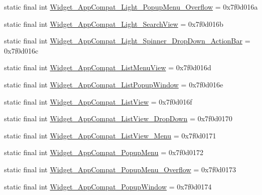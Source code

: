 \begin{DoxyCompactItemize}
static final int \mbox{\hyperlink{classandroid_1_1support_1_1v7_1_1appcompat_1_1R_1_1style_a8fd24e81a530ef4c300f29f6c046d707}{Widget\+\_\+\+App\+Compat\+\_\+\+Light\+\_\+\+Popup\+Menu\+\_\+\+Overflow}} = 0x7f0d016a
\item 
static final int \mbox{\hyperlink{classandroid_1_1support_1_1v7_1_1appcompat_1_1R_1_1style_a9f6f0009b817cabb1dafecf4b0c724c3}{Widget\+\_\+\+App\+Compat\+\_\+\+Light\+\_\+\+Search\+View}} = 0x7f0d016b
\item 
static final int \mbox{\hyperlink{classandroid_1_1support_1_1v7_1_1appcompat_1_1R_1_1style_a98acdcba1fa055bc28faa0fc74c7076a}{Widget\+\_\+\+App\+Compat\+\_\+\+Light\+\_\+\+Spinner\+\_\+\+Drop\+Down\+\_\+\+Action\+Bar}} = 0x7f0d016c
\item 
static final int \mbox{\hyperlink{classandroid_1_1support_1_1v7_1_1appcompat_1_1R_1_1style_a5d112506c796702ee241f523e76af8ce}{Widget\+\_\+\+App\+Compat\+\_\+\+List\+Menu\+View}} = 0x7f0d016d
\item 
static final int \mbox{\hyperlink{classandroid_1_1support_1_1v7_1_1appcompat_1_1R_1_1style_ad2af4cc0425e1ade5f5e5468ea0f6097}{Widget\+\_\+\+App\+Compat\+\_\+\+List\+Popup\+Window}} = 0x7f0d016e
\item 
static final int \mbox{\hyperlink{classandroid_1_1support_1_1v7_1_1appcompat_1_1R_1_1style_a1ceeced9a6c41e73bebf6d3531b7f05a}{Widget\+\_\+\+App\+Compat\+\_\+\+List\+View}} = 0x7f0d016f
\item 
static final int \mbox{\hyperlink{classandroid_1_1support_1_1v7_1_1appcompat_1_1R_1_1style_afae0a0c13593ec0b5f020075de5706a0}{Widget\+\_\+\+App\+Compat\+\_\+\+List\+View\+\_\+\+Drop\+Down}} = 0x7f0d0170
\item 
static final int \mbox{\hyperlink{classandroid_1_1support_1_1v7_1_1appcompat_1_1R_1_1style_a4323c3c0ee6ee31e74863ada981eeeb5}{Widget\+\_\+\+App\+Compat\+\_\+\+List\+View\+\_\+\+Menu}} = 0x7f0d0171
\item 
static final int \mbox{\hyperlink{classandroid_1_1support_1_1v7_1_1appcompat_1_1R_1_1style_ad3c806ce88489c9b3ef74ba1395ced31}{Widget\+\_\+\+App\+Compat\+\_\+\+Popup\+Menu}} = 0x7f0d0172
\item 
static final int \mbox{\hyperlink{classandroid_1_1support_1_1v7_1_1appcompat_1_1R_1_1style_a16c6dbc6371fa5e4d0cf07f332d50896}{Widget\+\_\+\+App\+Compat\+\_\+\+Popup\+Menu\+\_\+\+Overflow}} = 0x7f0d0173
\item 
static final int \mbox{\hyperlink{classandroid_1_1support_1_1v7_1_1appcompat_1_1R_1_1style_a33aca1a50cb4c38c4446ba6812d92650}{Widget\+\_\+\+App\+Compat\+\_\+\+Popup\+Window}} = 0x7f0d0174

\end{DoxyCompactItemize}
